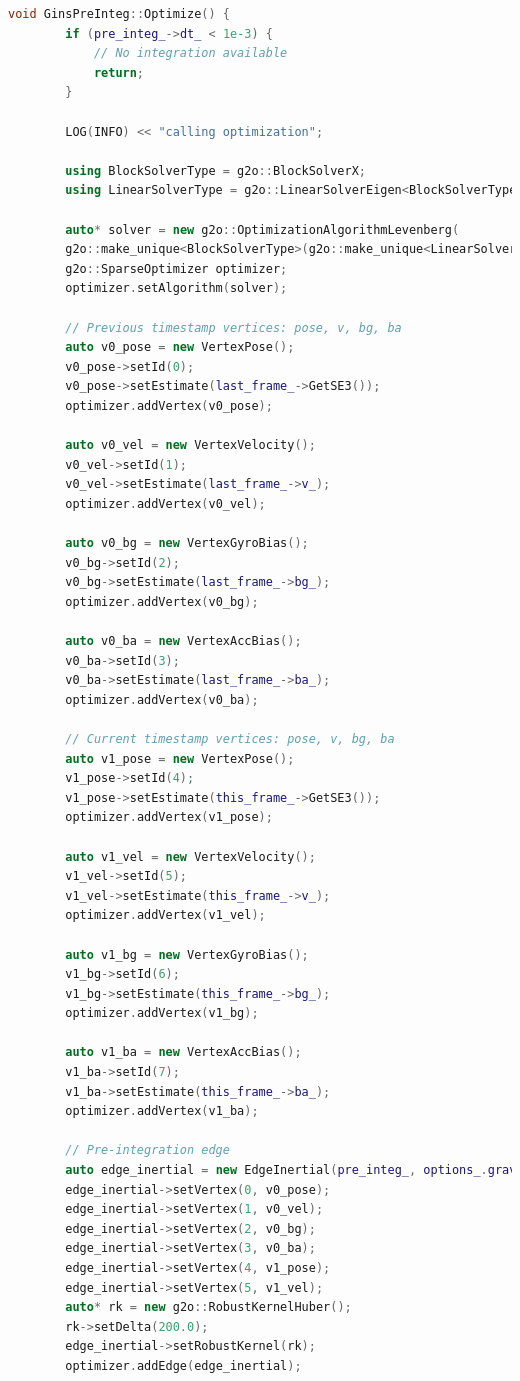 \begin{lstlisting}[language=c++,caption=src/ch4/gins\_pre\_integ.cc]
	void GinsPreInteg::Optimize() {
		if (pre_integ_->dt_ < 1e-3) {
			// No integration available
			return;
		}
		
		LOG(INFO) << "calling optimization";
		
		using BlockSolverType = g2o::BlockSolverX;
		using LinearSolverType = g2o::LinearSolverEigen<BlockSolverType::PoseMatrixType>;
		
		auto* solver = new g2o::OptimizationAlgorithmLevenberg(
		g2o::make_unique<BlockSolverType>(g2o::make_unique<LinearSolverType>()));
		g2o::SparseOptimizer optimizer;
		optimizer.setAlgorithm(solver);
		
		// Previous timestamp vertices: pose, v, bg, ba
		auto v0_pose = new VertexPose();
		v0_pose->setId(0);
		v0_pose->setEstimate(last_frame_->GetSE3());
		optimizer.addVertex(v0_pose);
		
		auto v0_vel = new VertexVelocity();
		v0_vel->setId(1);
		v0_vel->setEstimate(last_frame_->v_);
		optimizer.addVertex(v0_vel);
		
		auto v0_bg = new VertexGyroBias();
		v0_bg->setId(2);
		v0_bg->setEstimate(last_frame_->bg_);
		optimizer.addVertex(v0_bg);
		
		auto v0_ba = new VertexAccBias();
		v0_ba->setId(3);
		v0_ba->setEstimate(last_frame_->ba_);
		optimizer.addVertex(v0_ba);
		
		// Current timestamp vertices: pose, v, bg, ba
		auto v1_pose = new VertexPose();
		v1_pose->setId(4);
		v1_pose->setEstimate(this_frame_->GetSE3());
		optimizer.addVertex(v1_pose);
		
		auto v1_vel = new VertexVelocity();
		v1_vel->setId(5);
		v1_vel->setEstimate(this_frame_->v_);
		optimizer.addVertex(v1_vel);
		
		auto v1_bg = new VertexGyroBias();
		v1_bg->setId(6);
		v1_bg->setEstimate(this_frame_->bg_);
		optimizer.addVertex(v1_bg);
		
		auto v1_ba = new VertexAccBias();
		v1_ba->setId(7);
		v1_ba->setEstimate(this_frame_->ba_);
		optimizer.addVertex(v1_ba);
		
		// Pre-integration edge
		auto edge_inertial = new EdgeInertial(pre_integ_, options_.gravity_);
		edge_inertial->setVertex(0, v0_pose);
		edge_inertial->setVertex(1, v0_vel);
		edge_inertial->setVertex(2, v0_bg);
		edge_inertial->setVertex(3, v0_ba);
		edge_inertial->setVertex(4, v1_pose);
		edge_inertial->setVertex(5, v1_vel);
		auto* rk = new g2o::RobustKernelHuber();
		rk->setDelta(200.0);
		edge_inertial->setRobustKernel(rk);
		optimizer.addEdge(edge_inertial);
		

\end{lstlisting}
